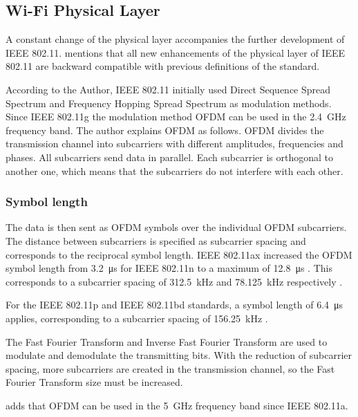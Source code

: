 \subsection*{Wi-Fi Physical Layer}
A constant change of the physical layer accompanies the further development of IEEE 802.11.
\textcite[286]{sauter_wireless_2022} mentions that all new enhancements of the physical layer of IEEE 802.11 are backward
compatible with previous definitions of the standard.

According to the Author, IEEE 802.11 initially used Direct Sequence Spread Spectrum and Frequency Hopping Spread Spectrum as modulation methods.
Since IEEE 802.11g the modulation method \ac{OFDM} can be used in the \SI{2.4}{\giga\hertz} frequency band.
The author explains \ac{OFDM} as follows. \ac{OFDM} divides the transmission channel into subcarriers with different
amplitudes, frequencies and phases.
All subcarriers send data in parallel.
Each subcarrier is orthogonal to another one, which means that the subcarriers do not interfere with each other.


\subsubsection*{Symbol length}
The data is then sent as \ac{OFDM} symbols over the individual \ac{OFDM} subcarriers.
The distance between subcarriers is specified as subcarrier spacing and corresponds to the reciprocal
symbol length.
IEEE 802.11ax increased the \ac{OFDM} symbol length from \SI{3.2}{\micro\second} for IEEE 802.11n to a maximum of \SI{12.8}{\micro\second} \cite[294,310]{sauter_wireless_2022}.
This corresponds to a subcarrier spacing of \SI{312.5}{\kilo\hertz} and \SI{78.125}{\kilo\hertz} respectively \cite[310]{sauter_wireless_2022}.

For the IEEE 802.11p and IEEE 802.11bd standards, a symbol length of \SI{6.4}{\micro\second} applies, corresponding to a subcarrier spacing of \SI{156.25}{\kilo\hertz} \cite{jacob_system-level_2020}.

The Fast Fourier Transform and Inverse Fast Fourier Transform are used to modulate and demodulate the transmitting bits.
With the reduction of subcarrier spacing, more subcarriers are created in the transmission channel,
so the Fast Fourier Transform size must be increased.

\textcite[132]{kauffels_wireless_2002} adds that \ac{OFDM} can be used in the \SI{5}{\giga\hertz} frequency band since IEEE 802.11a.
